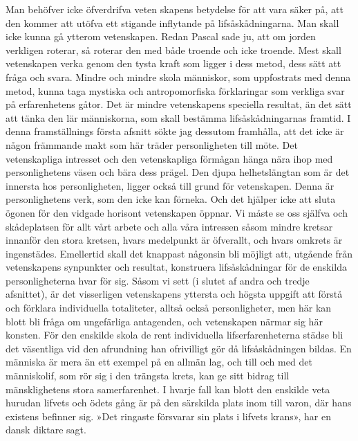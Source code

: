 \documentclass[12pt]{article}
\newcommand{\opage}[1]{\marginnote{\footnotesize\textit{[#1]}}}
\begin{document}
Man behöfver icke öfverdrifva veten%
\opage{63}
skapens betydelse för att vara säker på, att den kommer att utöfva ett stigande inflytande på lifsåskådningarna. Man skall icke kunna gå ytterom vetenskapen. Redan Pascal sade ju, att om jorden verkligen roterar, så roterar den med både troende och icke troende. Mest skall vetenskapen verka genom den tysta kraft som ligger i dess metod, dess sätt att fråga och svara. Mindre och mindre skola människor, som uppfostrats med denna metod, kunna taga mystiska och antropomorfiska förklaringar som verkliga svar på erfarenhetens gåtor. Det är mindre vetenskapens speciella resultat, än det sätt att tänka den lär människorna, som skall bestämma lifsåskådningarnas framtid. I denna framställnings första afsnitt sökte jag dessutom framhålla, att det icke är någon främmande makt som här träder personligheten till möte. Det vetenskapliga intresset och den vetenskapliga förmågan hänga nära ihop med personlighetens väsen och bära dess prägel. Den djupa helhetslängtan som är det innersta hos personligheten, ligger också till grund för vetenskapen. Denna är personlighetens verk, som den icke kan förneka. Och det hjälper icke att sluta ögonen för den %
\opage{64}
vidgade horisont vetenskapen öppnar. Vi måste se oss själfva och skådeplatsen för allt vårt arbete och alla våra intressen såsom mindre kretsar innanför den stora kretsen, hvars medelpunkt är öfverallt, och hvars omkrets är ingenstädes. Emellertid skall det knappast någonsin bli möjligt att, utgående från vetenskapens synpunkter och resultat, konstruera lifsåskådningar för de enskilda personligheterna hvar för sig. Såsom vi sett (i slutet af andra och tredje afsnittet), är det visserligen vetenskapens yttersta och högsta uppgift att förstå och förklara individuella totaliteter, alltså också personligheter, men här kan blott bli fråga om ungefärliga antagenden, och vetenskapen närmar sig här konsten. För den enskilde skola de rent individuella lifserfarenheterna städse bli det väsentliga vid den afrundning han ofrivilligt gör då lifsåskådningen bildas. En människa är mera än ett exempel på en allmän lag, och till och med det människolif, som rör sig i den trängsta krets, kan ge sitt bidrag till mänsklighetens stora samerfarenhet. I hvarje fall kan blott den enskilde veta hurudan lifvets och ödets gång är på den särskilda plats inom till%
\opage{65}
varon, där hans existens befinner sig. »Det ringaste försvarar sin plats i lifvets krans», har en dansk diktare sagt.
\end{document}
